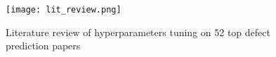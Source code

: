 \begin{figure}[t]
\vspace{-0.3cm}
\begin{center}
    \texttt{[image: lit\_review.png]}
\end{center}
\vspace{-0.2cm}
\caption{Literature review of hyperparameters tuning on 52 top defect prediction papers \cite{Fu16Grid}}\label{fig:litfigure}
\vspace{-0.5cm}
\end{figure}
